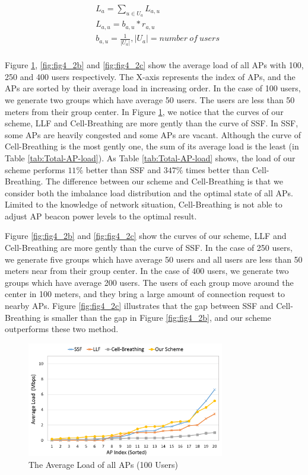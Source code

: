 \begin{align}
&L_a=\sum_{u\in{U_a}}L_{a,u}\\
&L_{a,u}=b_{a,u}*r_{a,u}\\
&b_{a,u}=\frac{1}{|U_a|}   ,|U_a|={number\ of\ users}
\end{align}
\\
Figure \ref{fig:fig4_2a}, \ref{fig:fig4_2b} and \ref{fig:fig4_2c} show the average load of all APs with 100, 250 and 400 users respectively. The X-axis represents the index of APs, and the APs are sorted by their average load in increasing order. In the case of 100 users, we generate two groups which have average 50 users. The users are less than 50 meters from their group center. In Figure \ref{fig:fig4_2a}, we notice that the curves of our scheme, LLF and Cell-Breathing are more gently than the curve of SSF. In SSF, some APs are heavily congested and some APs are vacant.  Although the curve of Cell-Breathing is the most gently one, the sum of its average load is the least (in Table \ref{tab:Total-AP-load}). As Table \ref{tab:Total-AP-load} shows, the load of our scheme performs $11\%$ better than SSF and $347\%$ times better than Cell-Breathing. The difference between our scheme and Cell-Breathing is that we consider both the imbalance load distribution and the optimal state of all APs. Limited to the knowledge of network situation, Cell-Breathing is not able to adjust AP beacon power levels to the optimal result.

Figure \ref{fig:fig4_2b} and \ref{fig:fig4_2c} show the curves of our scheme, LLF and Cell-Breathing are more gently than the curve of SSF. In the case of 250 users, we generate five groups which have average 50 users and all users are less than 50 meters near from their group center. In the case of 400 users, we generate two groups which have average 200 users. The users of each group move around the center in 100 meters, and they bring a large amount of connection request to nearby APs. Figure \ref{fig:fig4_2c} illustrates that the gap between SSF and Cell-Breathing is smaller than the gap in Figure \ref{fig:fig4_2b}, and our scheme outperforms these two method.

\begin{figure}[tbp]
\setlength{\abovecaptionskip}{0pt}
\setlength{\belowcaptionskip}{0pt}
\begin{center}
\includegraphics[width=3.4in]{images/Average_AP_load_100.png}
\end{center}
\caption{The Average Load of all APs (100 Users)}
\label{fig:fig4_2a}
\end{figure}


